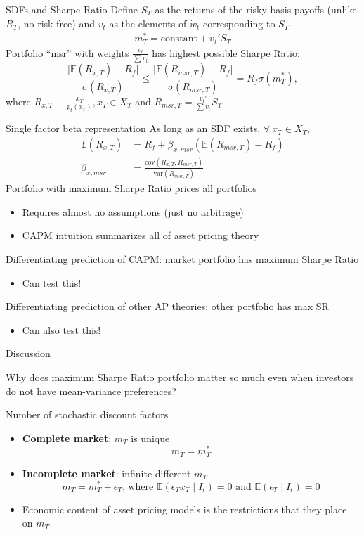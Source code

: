 \documentclass[xcolor=table, aspectratio=169]{beamer}
\begin{document}
\begin{frame}{SDFs and Sharpe Ratio}
Define $S_T$ as the returns of the risky basis payoffs (unlike $R_T$, no risk-free) and $v_t$ as the elements of $\dot{w}_t$ corresponding to $S_T$
\begin{align*}
m_T^* = \text{constant} + v_t' S_T
\end{align*}
Portfolio ``msr'' with weights $\frac{v_t}{\sum v_t}$ has highest possible Sharpe Ratio:
$$\frac{\vert \mathbb{E}(R_{x,T}) - R_f \vert}{\sigma(R_{x,T})} \leq \frac{ \vert \mathbb{E}(R_{msr,T}) - R_f \vert }{\sigma(R_{msr,T})} = R_f \sigma(m_T^*),$$ 
where $R_{x,T} \equiv \frac{x_T}{p_t(x_T)}, x_T \in X_T$ and $R_{msr,T} = \frac{v_t'}{\sum v_t} S_T$ 
\end{frame}

\begin{frame}{Single factor beta representation}
As long as an SDF exists, $\forall \: x_T \in X_T$,
\begin{align*}
\mathbb{E}(R_{x,T}) &= R_f + \beta_{x,msr} \left( \mathbb{E}(R_{msr,T}) - R_f \right) \\
\beta_{x,msr} &= \frac{\text{cov}(R_{x,T},R_{msr,T})}{\text{var}(R_{msr,T})}
\end{align*}
Portfolio with maximum Sharpe Ratio prices all portfolios
\begin{itemize}
\item Requires almost no assumptions (just no arbitrage)
\item CAPM intuition summarizes all of asset pricing theory
\end{itemize}
Differentiating prediction of CAPM: market portfolio has maximum Sharpe Ratio 
\begin{itemize}
\item Can test this!
\end{itemize}
Differentiating prediction of other AP theories: other portfolio has max SR
\begin{itemize}
\item Can also test this!
\end{itemize}
\end{frame}

\begin{frame}[t]{Discussion}

Why does maximum Sharpe Ratio portfolio matter so much even when investors do not have mean-variance preferences?

\end{frame}

\begin{frame}{Number of stochastic discount factors}
\begin{itemize}
\item \textbf{Complete market}: $m_T$ is unique
$$m_T = m_T^*$$
\item \textbf{Incomplete market}: infinite different $m_T$
$$m_T = m_T^* + \epsilon_T \text{, where } \mathbb{E}\left( \epsilon_T x_T \mid I_t \right) = 0 \text{ and } \mathbb{E}\left( \epsilon_T \mid I_t \right) = 0$$
\item Economic content of asset pricing models is the restrictions that they place on $m_T$
\end{itemize}
\end{frame}
\end{document}
